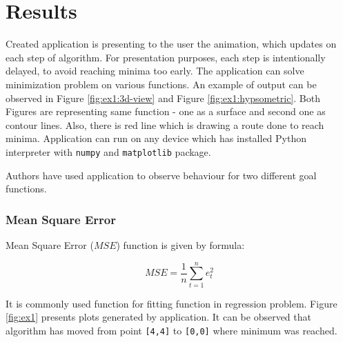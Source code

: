 \documentclass[11pt,a4paper]{IEEEtran}
\begin{document}
\section{Results}
Created application is presenting to the user the animation, which updates on each step of algorithm. For presentation purposes, each step is intentionally delayed, to avoid reaching minima too early.
The application can solve minimization problem on various functions. An example of output can be observed in Figure \ref{fig:ex1:3d-view} and Figure \ref{fig:ex1:hypsometric}. Both Figures are representing same function - one as a surface and second one as contour lines. Also, there is red line which is drawing a route done to reach minima.
Application can run on any device which has installed Python interpreter with \texttt{numpy} and \texttt{matplotlib} package.

Authors have used application to observe behaviour for two different goal functions.
\\

\subsubsection{Mean Square Error}
Mean Square Error ($MSE$) function is given by formula:

$$ MSE = \frac{1}{n}\sum_{t=1}^{n}e_t^2 $$

It is commonly used function for fitting function in regression problem. Figure \ref{fig:ex1} presents plots generated by application. It can be observed that algorithm has moved from point \texttt{[4,4]} to \texttt{[0,0]} where minimum was reached.
\end{document}

